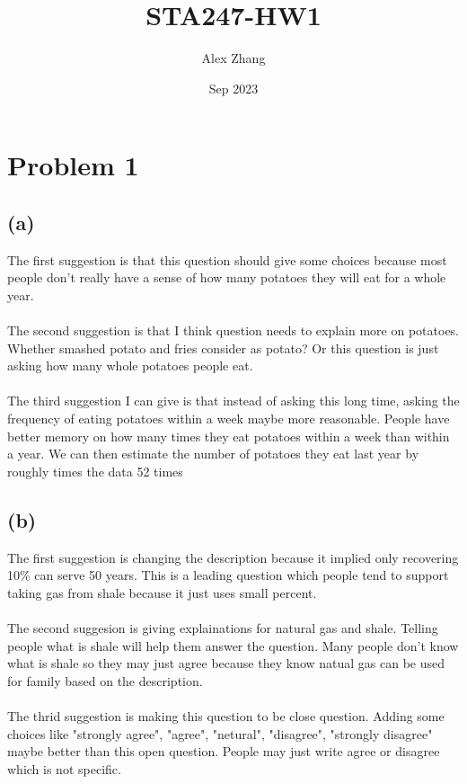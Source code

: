 \documentclass{article}
\title{STA247-HW1}
\author{Alex Zhang}
\date{Sep 2023}
\begin{document}
\maketitle
\section*{Problem 1}
\subsection*{(a)}
The first suggestion is that this question should give some choices because most people don't really have a sense of how many potatoes they will eat for a whole year.\\
\\
The second suggestion is that I think question needs to explain more on potatoes. Whether smashed potato and fries consider as potato?
Or this question is just asking how many whole potatoes people eat.\\
\\
The third suggestion I can give is that instead of asking this long time, asking the frequency of eating potatoes within a week maybe more reasonable.
People have better memory on how many times they eat potatoes within a week than within a year. We can then estimate the number of potatoes they eat last year by roughly times the data 52 times\\



\subsection*{(b)}
The first suggestion is changing the description because it implied only recovering 10\% can serve 50 years. This is a leading question which people tend to support taking gas from shale because it just uses small percent.\\
\\
The second suggesion is giving explainations for natural gas and shale. Telling people what is shale will help them answer the question. Many people don't know what is shale so they may just agree because they know natual gas can be used for family based on the description.\\
\\
The thrid suggestion is making this question to be close question. Adding some choices like "strongly agree", "agree", "netural", "disagree", "strongly disagree" maybe better than this open question.
People may just write agree or disagree which is not specific.\\
\end{document}
